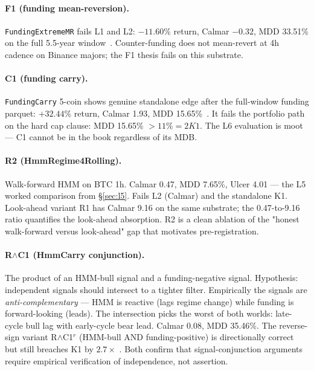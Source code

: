 \documentclass[11pt]{article}
\begin{document}
\paragraph{F1 (funding mean-reversion).} \texttt{FundingExtremeMR} fails L1
and L2: $-11.60\%$ return, Calmar $-0.32$, MDD 33.51\% on the full 5.5-year
window~\citep{result_funding_mr_fullwin}. Counter-funding does not
mean-revert at 4h cadence on Binance majors; the F1 thesis fails on this
substrate.

\paragraph{C1 (funding carry).} \texttt{FundingCarry} 5-coin shows genuine
standalone edge after the full-window funding parquet: $+32.44\%$ return,
Calmar 1.93, MDD 15.65\%~\citep{result_funding_carry_fullwin}. It fails the
portfolio path on the hard cap clause: MDD 15.65\% $> 11\% = 2 K1$. The L6
evaluation is moot --- C1 cannot be in the book regardless of its MDB.

\paragraph{R2 (HmmRegime4Rolling).} Walk-forward HMM on BTC 1h. Calmar 0.47,
MDD 7.65\%, Ulcer 4.01 --- the L5 worked comparison from \S\ref{sec:l5}.
Fails L2 (Calmar) and the standalone K1. Look-ahead variant R1 has Calmar
9.16 on the same substrate; the 0.47-to-9.16 ratio quantifies the look-ahead
absorption. R2 is a clean ablation of the "honest walk-forward versus
look-ahead" gap that motivates pre-registration.

\paragraph{R$\wedge$C1 (HmmCarry conjunction).} The product of an HMM-bull
signal and a funding-negative signal. Hypothesis: independent signals should
intersect to a tighter filter. Empirically the signals are
\emph{anti-complementary} --- HMM is reactive (lags regime change) while
funding is forward-looking (leads). The intersection picks the worst of both
worlds: late-cycle bull lag with early-cycle bear lead. Calmar 0.08, MDD
35.46\%. The reverse-sign variant R$\wedge$C1$^r$ (HMM-bull AND
funding-positive) is directionally correct but still breaches K1 by $2.7\times$
\citep{result_hmm_carry_reverse}. Both confirm that signal-conjunction
arguments require empirical verification of independence, not assertion.
\end{document}
